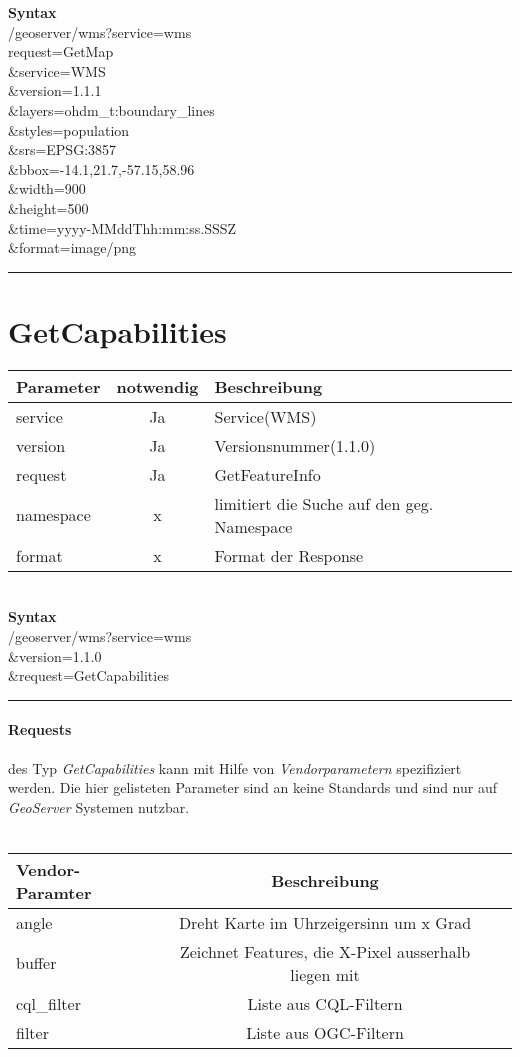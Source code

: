 \textbf{Syntax}\\
/geoserver/wms?service=wms\\
request=GetMap\\
\&service=WMS\\
\&version=1.1.1\\
\&layers=ohdm\_t:boundary\_lines\\
\&styles=population\\
\&srs=EPSG:3857\\
\&bbox=-14.1,21.7,-57.15,58.96\\
\&width=900\\
\&height=500\\
\&time=yyyy-MMddThh:mm:ss.SSSZ\\
\&format=image/png\\
\hrule
\newpage
\section{GetCapabilities}
\begin{tabular}{lcl}
\textbf{Parameter} & \textbf{notwendig} & \textbf{Beschreibung}\\
\hline 
service & Ja & Service(WMS) \\ 
\hline 
version & Ja & Versionsnummer(1.1.0) \\ 
\hline 
request & Ja & GetFeatureInfo \\ 
\hline 
namespace & x &  limitiert die Suche auf den geg. Namespace\\
\hline
format & x & Format der Response\\
\hline
\end{tabular}\\

\textbf{Syntax}\\
/geoserver/wms?service=wms\\
\&version=1.1.0\\
\&request=GetCapabilities\\
\hrule
\paragraph{Requests}
des Typ \emph{GetCapabilities} kann mit Hilfe von \emph{Vendorparametern} spezifiziert werden. Die hier gelisteten Parameter sind an keine Standards und sind nur auf \emph{GeoServer} Systemen nutzbar.\\\\
\begin{tabular}{lcl}
\textbf{Vendor-Paramter} & \textbf{Beschreibung} \\
\hline 
angle  & Dreht Karte im Uhrzeigersinn um x Grad\\ 
\hline 
buffer  & Zeichnet Features, die X-Pixel ausserhalb liegen mit  \\ 
\hline 
cql\_filter &  Liste aus CQL-Filtern \\
\hline
filter & Liste aus OGC-Filtern \\
\hline

\end{tabular} 
